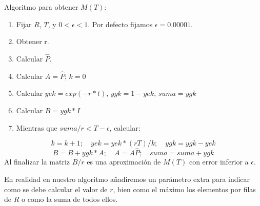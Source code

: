 \documentclass[
]{book}
\providecommand{\tightlist}{%
  \setlength{\itemsep}{0pt}\setlength{\parskip}{0pt}}
\newenvironment{silverbox}{
  \definecolor{shadecolor}{rgb}{192, 192, 192}  
  \color{black}
  \begin{shaded}}
 {\end{shaded}}
\theoremstyle{definition}
\theoremstyle{definition}
\theoremstyle{definition}
\theoremstyle{definition}
\theoremstyle{remark}
\begin{document}
\begin{silverbox}
Algoritmo para obtener \(M(T)\):

\begin{enumerate}
\def\labelenumi{\arabic{enumi}.}
\tightlist
\item
  Fijar \(R\), \(T\), y \(0 < \epsilon < 1\). Por defecto fijamos \(\epsilon = 0.00001\).
\item
  Obtener r.
\item
  Calcular \(\hat{P}\).
\item
  Calcular \(A = \hat{P}\); \(k = 0\)
\item
  Calcular \(yek = exp(-r*t)\), \(ygk = 1 - yek\), \(suma = ygk\)
\item
  Calcular \(B = ygk * I\)
\item
  Mientras que \(suma/r < T-\epsilon\), calcular:
\end{enumerate}

\[k = k + 1; \quad yek = yek*(rT)/k; \quad ygk = ygk - yek\]
\[B = B + ygk*A; \quad A = A\hat{P}; \quad suma = suma + ygk\]
Al finalizar la matriz \(B/r\) es una aproximación de \(M(T)\) con error inferior a \(\epsilon\).

\end{silverbox}

En realidad en nuestro algoritmo añadiremos un parámetro extra para indicar como se debe calcular el valor de \(r\), bien como el máximo los elementos por filas de \(R\) o como la suma de todos ellos.
\end{document}

